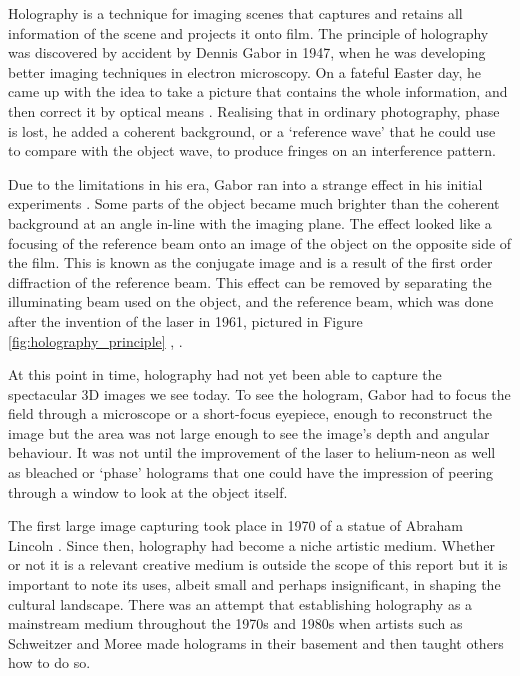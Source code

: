 \documentclass[aps,prl,reprint,10pt,amsmath,amssymb,superscriptaddress,a4paper]{revtex4-2}
\begin{document}
Holography is a technique for imaging scenes that captures and retains all information of the scene and projects it onto film. The 
principle of holography was discovered by accident by Dennis Gabor in 1947, when he was developing better imaging techniques in 
electron microscopy. On a fateful Easter day, he came up with the idea to take a picture that contains the whole information, and 
then correct it by optical means \citep{gabor}. Realising that in ordinary photography, phase is lost, he added a coherent background, 
or a `reference wave' that he could use to compare with the object wave, to produce fringes on an interference pattern.


Due to the limitations in his era, Gabor ran into a strange effect in his initial experiments \citep{gaboring}. Some parts of the 
object became much brighter than the coherent background at an angle in-line with the imaging plane. The effect looked like a focusing 
of the reference beam onto an image of the object on the opposite side of the film. This is known as the conjugate image and is a 
result of the first order diffraction of the reference beam. This effect can be removed by separating the illuminating beam used on 
the object, and the reference beam, which was done after the invention of the laser in 1961, pictured in Figure \ref{fig:holography_principle}
, \citep{leithupatnieks}.

At this point in time, holography had not yet been able to capture the spectacular 3D images we see today. To see the hologram, Gabor 
had to focus the field through a microscope or a short-focus eyepiece, enough to reconstruct the image but the area was not large enough 
to see the image's depth and angular behaviour. It was not until the improvement of the laser to helium-neon as well as bleached or 
`phase' holograms that one could have the impression of peering through a window to look at the object itself.

The first large image capturing took place in 1970 of a statue of Abraham Lincoln \citep{stroke}. Since then, holography had become a 
niche artistic medium. Whether or not it is a relevant creative medium is outside the scope of this report but it is important to note 
its uses, albeit small and perhaps insignificant, in shaping the cultural landscape. There was an attempt that establishing holography 
as a mainstream medium throughout the 1970s and 1980s when artists such as Schweitzer and Moree made holograms in their basement and then 
taught others how to do so. 
\end{document}
